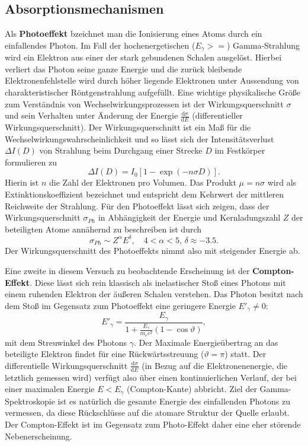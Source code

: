 \subsection{Absorptionsmechanismen}
Als \textbf{Photoeffekt} bzeichnet man die Ionisierung eines Atoms durch ein einfallendes Photon. Im Fall der 
hochenergetischen ($E_\gamma >= $) Gamma-Strahlung wird ein Elektron aus einer der stark gebundenen Schalen 
ausgelöst. Hierbei verliert das Photon seine ganze Energie und die zurück bleibende Elektronenfehlstelle wird durch 
höher liegende Elektronen unter Aussendung von charakteristischer Röntgenstrahlung aufgefüllt. Eine wichtige physikalische 
Größe zum Verständnis von Wechselwirkungsprozessen ist der Wirkungsquerschnitt $\sigma$ und sein Verhalten unter 
Änderung der Energie $\frac{\mathup{d}\sigma}{\mathup{d}E}$ (differentieller Wirkungsquerschnitt). Der Wirkungsquerschnitt 
ist ein Maß für die Wechselwirkungswahrscheinlichkeit und so lässt sich der Intensitätsverlust $\Delta I(D)$ von Strahlung beim Durchgang einer 
Strecke $D$ im Festkörper formulieren zu 
\begin{equation}
    \Delta I(D) = I_0 \left[1 -  \exp\left(- n \sigma D\right)\right].
\end{equation}
Hierin ist $n$ die Zahl der Elektronen pro Volumen. Das Produkt $\mu = n \sigma$ wird als Extinktionskoeffizient 
bezeichnet und entspricht dem Kehrwert der mittleren Reichweite der Strahlung.
Für den Photoeffekt lässt sich zeigen, dass der Wirkungsquerschnitt $\sigma_{Ph}$ in Abhängigkeit der Energie und 
Kernladungszahl $Z$ der beteiligten Atome annähernd zu beschreiben ist durch 
\begin{equation}
    \sigma_{Ph} \sim Z^{\alpha} E^{\delta}, \quad 4 < \alpha < 5, \, \delta \approx -\num{3.5}.
\end{equation}
Der Wirkungsquerschnitt des Photoeffekts nimmt also mit steigender Energie ab. 

Eine zweite in diesem Versuch zu beobachtende Erscheinung ist der \textbf{Compton-Effekt}. Diese lässt sich rein 
klassisch als inelastischer Stoß eines Photons mit einem ruhenden Elektron der äußeren Schalen verstehen. Das Photon besitzt nach 
dem Stoß im Gegensatz zum Photoeffekt eine geringere Energie $E'_\gamma \neq 0$: 
\begin{equation}
    {E'}_{\!\gamma} = \frac{E_\gamma}{1 + \frac{E_\gamma}{m_e c^2} \left(1 - \cos\vartheta \right)},
\end{equation}
mit dem Streuwinkel des Photons $\gamma$. Der Maximale Energieübertrag an das beteiligte Elektron findet für eine 
Rückwärtsstreuung ($\vartheta = \pi$) statt. Der differentielle Wirkungsquerschnitt $\frac{\mathup{d}\sigma}{\mathup{d}E}$
(in Bezug auf die Elektronenenergie, die letztlich gemessen wird) verfügt also über einen kontinuierlichen Verlauf, der 
bei einer maximalen Energie $E < E_\gamma$ (Compton-Kante) abbricht. Ziel der Gamma-Spektroskopie ist es natürlich die 
gesamte Energie des einfallenden Photons zu vermessen, da diese Rückschlüsse auf die atomare Struktur der Quelle 
erlaubt. Der Compton-Effekt ist im Gegensatz zum Photo-Effekt daher eine eher störende Nebenerscheinung.


